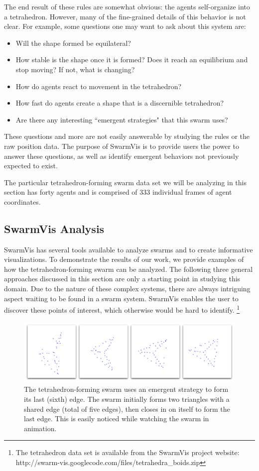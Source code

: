 \documentclass[conference]{IEEEtran}
\begin{document}
The end result of these rules are somewhat obvious: the agents self-organize into a tetrahedron.
However, many of the fine-grained details of this behavior is not clear.
For example, some questions one may want to ask about this system are: 
\begin{itemize}
\item Will the shape formed be equilateral?
\item How stable is the shape once it is formed? Does it reach an equilibrium and stop moving? If not, what is changing?
\item How do agents react to movement in the tetrahedron?
\item How fast do agents create a shape that is a discernible tetrahedron?
\item Are there any interesting ``emergent strategies" that this swarm uses?
\end{itemize}
These questions and  more are not easily answerable by studying the rules or the raw position data.
The purpose of SwarmVis is to provide users the power to answer these questions,
as well as identify emergent behaviors not previously expected to exist.

The particular tetrahedron-forming swarm data set we will be analyzing in this section has forty agents
and is comprised of 333 individual frames of agent coordinates.

\subsection{SwarmVis Analysis}
SwarmVis has several tools available to analyze swarms and to create informative visualizations.
To demonstrate the results of our work, we provide examples of how the tetrahedron-forming swarm can be analyzed.
The following three general approaches discussed in this section are only a starting point in studying this domain.
Due to the nature of these complex systems, there are always intriguing aspect waiting to be found in a swarm system.
SwarmVis enables the user to discover these points of interest, which otherwise would be hard to identify.
\footnote{The tetrahedron
data set is available from the SwarmVis project website: http://swarm-vis.googlecode.com/files/tetrahedra\_boids.zip}


\begin{figure}
\centering
\includegraphics[scale=.3]{images/tetraclosing.pdf}
\caption{
The tetrahedron-forming swarm uses an emergent strategy to form its last (sixth) edge.
The swarm initially forms two triangles with a shared edge (total of five edges), then
closes in on itself to form the last edge. This is easily noticed while watching the swarm in animation.}
\label{TetraClosing}
\end{figure}
\end{document}
